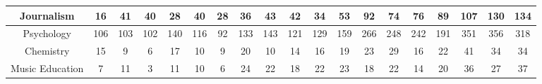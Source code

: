 \documentclass[10]{article}
\begin{document}
\begin{landscape}
\begin{longtable}[c]{|ccccccccccccccccccc|}
	\multicolumn{1}{|c|}{Journalism}                                 & \multicolumn{1}{c|}{16}         & \multicolumn{1}{c|}{41}         & \multicolumn{1}{c|}{40}         & \multicolumn{1}{c|}{28}         & \multicolumn{1}{c|}{40}         & \multicolumn{1}{c|}{28}         & \multicolumn{1}{c|}{36}         & \multicolumn{1}{c|}{43}         & \multicolumn{1}{c|}{42}         & \multicolumn{1}{c|}{34}         & \multicolumn{1}{c|}{53}         & \multicolumn{1}{c|}{92}         & \multicolumn{1}{c|}{74}         & \multicolumn{1}{c|}{76}         & \multicolumn{1}{c|}{89}         & \multicolumn{1}{c|}{107}        & \multicolumn{1}{c|}{130}        & 134        \\ \hline
	\multicolumn{1}{|c|}{Psychology}                                 & \multicolumn{1}{c|}{106}        & \multicolumn{1}{c|}{103}        & \multicolumn{1}{c|}{102}        & \multicolumn{1}{c|}{140}        & \multicolumn{1}{c|}{116}        & \multicolumn{1}{c|}{92}         & \multicolumn{1}{c|}{133}        & \multicolumn{1}{c|}{143}        & \multicolumn{1}{c|}{121}        & \multicolumn{1}{c|}{129}        & \multicolumn{1}{c|}{159}        & \multicolumn{1}{c|}{266}        & \multicolumn{1}{c|}{248}        & \multicolumn{1}{c|}{242}        & \multicolumn{1}{c|}{191}        & \multicolumn{1}{c|}{351}        & \multicolumn{1}{c|}{356}        & 318        \\ \hline
	\multicolumn{1}{|c|}{Chemistry}                                  & \multicolumn{1}{c|}{15}         & \multicolumn{1}{c|}{9}          & \multicolumn{1}{c|}{6}          & \multicolumn{1}{c|}{17}         & \multicolumn{1}{c|}{10}         & \multicolumn{1}{c|}{9}          & \multicolumn{1}{c|}{20}         & \multicolumn{1}{c|}{10}         & \multicolumn{1}{c|}{14}         & \multicolumn{1}{c|}{16}         & \multicolumn{1}{c|}{19}         & \multicolumn{1}{c|}{23}         & \multicolumn{1}{c|}{29}         & \multicolumn{1}{c|}{16}         & \multicolumn{1}{c|}{22}         & \multicolumn{1}{c|}{41}         & \multicolumn{1}{c|}{34}         & 34         \\ \hline
	\multicolumn{1}{|c|}{Music Education}                            & \multicolumn{1}{c|}{7}          & \multicolumn{1}{c|}{11}         & \multicolumn{1}{c|}{3}          & \multicolumn{1}{c|}{11}         & \multicolumn{1}{c|}{10}         & \multicolumn{1}{c|}{6}          & \multicolumn{1}{c|}{24}         & \multicolumn{1}{c|}{22}         & \multicolumn{1}{c|}{18}         & \multicolumn{1}{c|}{22}         & \multicolumn{1}{c|}{23}         & \multicolumn{1}{c|}{18}         & \multicolumn{1}{c|}{22}         & \multicolumn{1}{c|}{14}         & \multicolumn{1}{c|}{20}         & \multicolumn{1}{c|}{36}         & \multicolumn{1}{c|}{27}         & 37         \\ \hline

\end{longtable}
\end{landscape}
\end{document}
